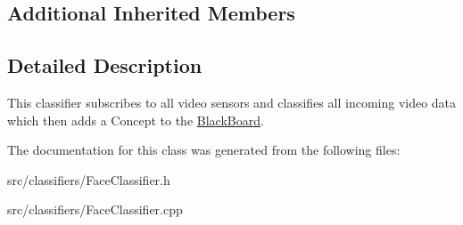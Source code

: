 \subsection*{Additional Inherited Members}


\subsection{Detailed Description}
This classifier subscribes to all video sensors and classifies all incoming video data which then adds a Concept to the \hyperlink{class_black_board}{Black\+Board}. 

The documentation for this class was generated from the following files\+:\begin{DoxyCompactItemize}
\item 
src/classifiers/Face\+Classifier.\+h\item 
src/classifiers/Face\+Classifier.\+cpp\end{DoxyCompactItemize}
